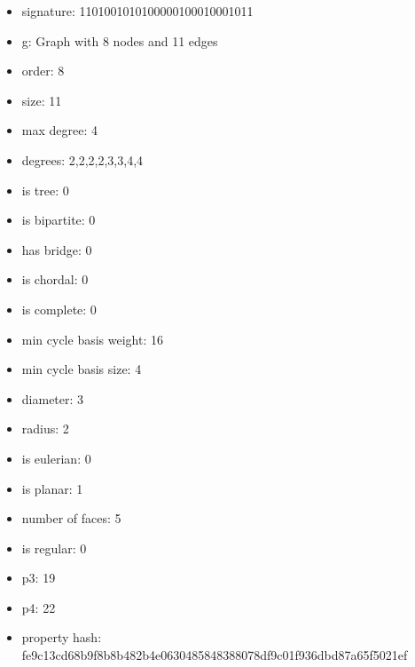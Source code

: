 \begin{itemize}
\item signature: 1101001010100000100010001011
\item g: Graph with 8 nodes and 11 edges
\item order: 8
\item size: 11
\item max degree: 4
\item degrees: 2,2,2,2,3,3,4,4
\item is tree: 0
\item is bipartite: 0
\item has bridge: 0
\item is chordal: 0
\item is complete: 0
\item min cycle basis weight: 16
\item min cycle basis size: 4
\item diameter: 3
\item radius: 2
\item is eulerian: 0
\item is planar: 1
\item number of faces: 5
\item is regular: 0
\item p3: 19
\item p4: 22
\item property hash: fe9c13cd68b9f8b8b482b4e0630485848388078df9c01f936dbd87a65f5021ef
\end{itemize}
\newpage
\begin{figure}
\end{figure}
